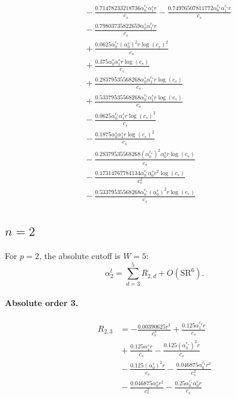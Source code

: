 \documentclass[10pt]{article}
\begin{document}
\begin{align*}
&{}  - \frac{0.71478233218736 \alpha_{0}^{c_s} \alpha_{1}^s r}{c_{s}} - \frac{0.74976507811772 \alpha_{0}^{c_s} \alpha_{1}^{c_s} r}{c_{s}} \\
&{}  - \frac{0.79803735822659 \alpha_{0}^s \alpha_{1}^{c_s} r}{c_{s}} \\
&{}  + \frac{0.0625 \alpha_{0}^{c_s} \left(\alpha_{0}^s\right)^{2} r \log{\left(c_{s} \right)}^{2}}{c_{s}} \\
&{}  + \frac{0.375 \alpha_{0}^s \alpha_{1}^s r \log{\left(c_{s} \right)}}{c_{s}} \\
&{}  + \frac{0.28379535568268 \alpha_{0}^s \alpha_{1}^{c_s} r \log{\left(c_{s} \right)}}{c_{s}} \\
&{}  + \frac{0.53379535568268 \alpha_{0}^{c_s} \alpha_{1}^s r \log{\left(c_{s} \right)}}{c_{s}} \\
&{}  - \frac{0.0625 \alpha_{0}^{c_s} \alpha_{1}^s r \log{\left(c_{s} \right)}^{2}}{c_{s}} \\
&{}  - \frac{0.1875 \alpha_{0}^s \alpha_{1}^s r \log{\left(c_{s} \right)}^{2}}{c_{s}} \\
&{}  - \frac{0.28379535568268 \left(\alpha_{0}^{c_s}\right)^{2} \alpha_{0}^s r \log{\left(c_{s} \right)}}{c_{s}} \\
&{}  - \frac{0.17314767784134 \alpha_{0}^{c_s} \alpha_{0}^s r^{2} \log{\left(c_{s} \right)}}{c_{s}^{2}} \\
&{}  - \frac{0.53379535568268 \alpha_{0}^{c_s} \left(\alpha_{0}^s\right)^{2} r \log{\left(c_{s} \right)}}{c_{s}}
\end{align*}

\subsection{$n=2$}
For $p=2$, the absolute cutoff is $W=5$:
\[\alpha_{2}^t=\sum_{d=3}^{5}R_{2,d}+O(\mathrm{SR}^{6}).\]
\paragraph{Absolute order 3.}
\begin{align*}
R_{2,3} &=  - \frac{0.00390625 r^{3}}{c_{s}^{3}} + \frac{0.125 \alpha_{1}^{c_s} r}{c_{s}} \\
&{}  + \frac{0.125 \alpha_{1}^s r}{c_{s}} - \frac{0.125 \left(\alpha_{0}^{c_s}\right)^{2} r}{c_{s}} \\
&{}  - \frac{0.125 \left(\alpha_{0}^s\right)^{2} r}{c_{s}} - \frac{0.046875 \alpha_{0}^{c_s} r^{2}}{c_{s}^{2}} \\
&{}  - \frac{0.046875 \alpha_{0}^s r^{2}}{c_{s}^{2}} - \frac{0.25 \alpha_{0}^{c_s} \alpha_{0}^s r}{c_{s}}
\end{align*}
\end{document}
